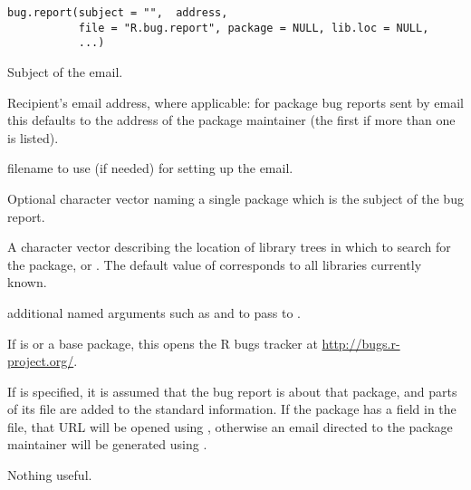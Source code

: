 %
\begin{Usage}
\begin{verbatim}
bug.report(subject = "",  address,
           file = "R.bug.report", package = NULL, lib.loc = NULL,
           ...)
\end{verbatim}
\end{Usage}
%
\begin{Arguments}
\begin{ldescription}
\item[\code{subject}] Subject of the email.
\item[\code{address}] Recipient's email address, where applicable: for
package bug reports sent by email this defaults to the address of
the package maintainer (the first if more than one is listed).
\item[\code{file}] filename to use (if needed) for setting up the email.
\item[\code{package}] Optional character vector naming a single package which is 
the subject of the bug report.
\item[\code{lib.loc}] A character vector describing the location of \R{}
library trees in which to search for the package, or .
The default value of  corresponds to all libraries
currently known.
\item[\code{...}] additional named arguments such as  and
 to pass to .
\end{ldescription}
\end{Arguments}
%
\begin{Details}\relax
If  is  or a base package, this opens the R
bugs tracker at \url{http://bugs.r-project.org/}.

If  is specified, it is assumed that the bug report is
about that package, and parts of its  file are
added to the standard information.  If the package has a
 field in the  file, that URL
will be opened using , otherwise an email
directed to the package maintainer will be generated using
.  
\end{Details}
%
\begin{Value}
Nothing useful.
\end{Value}
%
